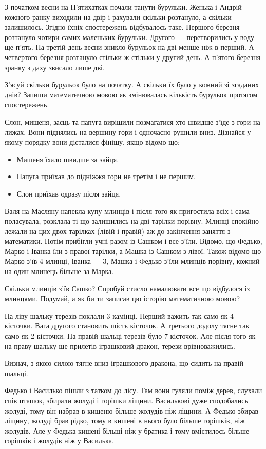 \problem
З початком весни на П'ятихатках почали танути бурульки.
Женька і Андрій кожного ранку виходили на двір і рахували скільки розтануло,
а скільки залишилось.
Згідно їхніх спостережень відбувалось таке.
Першого березня розтануло чотири самих маленьких бурульки.
Другого --- перетворились у воду ще п'ять.
На третій день весни зникло бурульок на дві менше ніж в перший.
А четвертого березня розтануло стільки ж стільки у другий день.
А п'ятого березня зранку з даху звисало лише дві.

З'ясуй скільки бурульок було на початку.
А скільки їх було у кожний зі згаданих днів?
Запиши математичною мовою як змінювалась кількість бурульок
протягом спостережень.


\problem
Слон, мишеня, заєць та папуга вирішили позмагатися хто швидше з'їде
з гори на лижах. Вони піднялись на вершину гори і одночасно рушили вниз.
Дізнайся у якому порядку вони дісталися фінішу, якщо відомо що:
\begin{itemize}
    \item Мишеня їхало швидше за зайця.
    \item Папуга приїхав до підніжжя гори не третім і не першим.
    \item Слон приїхав одразу після зайця.
\end{itemize}


\problem
Валя на Масляну напекла купу млинців і після того як пригостила всіх
і сама поласувала, розклала ті що залишились на дві тарілки порівну.
Млинці спокійно лежали на цих двох тарілках (лівій і правій)
аж до закінчення заняття з математики.
Потім прибігли учні разом із Сашком і все з'їли.
Відомо, що Федько, Марко і Іванка їли з правої тарілки,
а Машка із Сашком з лівої.
Також відомо що Марко з'їв 4 млинці, Іванка --- 3,
Машка і Федько з'їли млинців порівну, кожний на один млинець більше за Марка.

Скільки млинців з'їв Сашко?
Спробуй стисло намалювати все що відбулося із млинцями.
Подумай, а як би ти записав цю історію математичною мовою?


\problem
На ліву шальку терезів поклали 3 камінці.
Перший важить так само як 4 кісточки.
Вага другого становить шість кісточок.
А третього додолу тягне так само як 2 кісточки.
На правій шальці терезів було 7 кісточок.
Але після того як на праву шальку ще прилетів іграшковий дракон,
терези врівноважились.

Визнач, з якою силою тягне вниз іграшкового дракона,
що сидить на правій шальці.


\problem
Федько і Василько пішли з татком до лісу.
Там вони гуляли поміж дерев, слухали спів пташок,
збирали жолуді і горішки ліщини. 
Василькові дуже сподобались жолуді, тому він набрав в кишеню більше
жолудів ніж ліщини. А Федько збирав ліщину, жолуді брав рідко,
тому в кишені в нього було більше горішків, ніж жолудів. 
Але у Федька кишені більші ніж у братика і тому вмістилось
більше горішків і жолудів ніж у Василька. 

